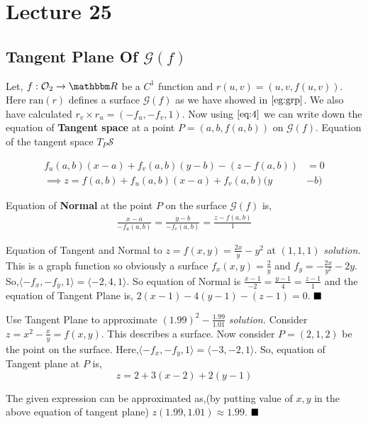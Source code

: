 \documentclass[Analysis-3]{subfiles}
\begin{document}
\chapter*{Lecture 25} %
\setcounter{chapter}{25} %
\setcounter{section}{0}
\section{Tangent Plane Of $\mathcal{G}(f)$}

Let, $f : \mathcal{O}_2 \to \R$ be a $C^1$ function and $r(u,v) = (u,v,f(u,v))$. Here $\text{ran}(r)$ defines a surface $\mathcal{G}(f)$ as we have showed in $\ref{eg:grp}$. We also have calculated $r_v\times r_u = (-f_u,-f_v,1)$. Now using $\ref{eq:4}$ we can write down the equation of \textbf{Tangent space} at a point $P = (a,b,f(a,b))$ on $\mathcal{G}(f)$. Equation of the tangent space $T_P \mathcal{S}$ 

\begin{align}\label{eq:tp} 
    f_u(a,b)(x-a) + f_v(a,b)(y-b)-(z-f(a,b)) &= 0 \\
    \implies z = f(a,b) + f_u(a,b)(x-a) + f_v(a,b)(y &-b) 
\end{align}

Equation of \textbf{Normal} at the point $P$ on the surface $\mathcal{G}(f)$ is,
\begin{align}\label{eq:np}
    \frac{x-a}{-f_u(a,b)} = \frac{y-b}{-f_v(a,b)} = \frac{z-f(a,b)}{1} 
\end{align}

\begin{Eg}{Equation of Tangent and Normal to $z = f(x,y) = \frac{2x}{y}-y^2$ at $(1,1,1)$}{}
    \textit{solution.} This is a graph function so obviously a surface $f_x(x,y) = \frac{2}{y}$ and $f_y = -\frac{2x}{y^2} -2y$. So,$\langle -f_x,- f_y,1 \rangle = \langle -2,4,1\rangle$. So equation of Normal 
 is $\frac{x-1}{-2}=\frac{y-1}{4}=\frac{z-1}{1}$ and the equation of Tangent Plane is,
  $ 2(x-1)-4(y-1) -(z-1) = 0$. $\hfill \blacksquare $ 
\end{Eg}
\begin{Eg}{Use Tangent Plane to approximate $(1.99)^2 - \frac{1.99}{1.01}$}{}
    \textit{solution.} Consider $z = x^2 - \frac{x}{y} = f(x,y)$. This describes a surface. Now consider $P=(2,1,2)$ be the point on the surface. Here,$\langle -f_x,- f_y,1 \rangle = \langle -3,-2,1\rangle$. So, equation of Tangent plane at $P$ is, \[z = 2 +3(x-2) +2(y-1)\]

    The given expression can be approximated as,(by putting value of $x,y$ in the above equation of tangent plane) $z(1.99,1.01) \approx 1.99$. $\hfill \blacksquare$
\end{Eg}
\end{document}
